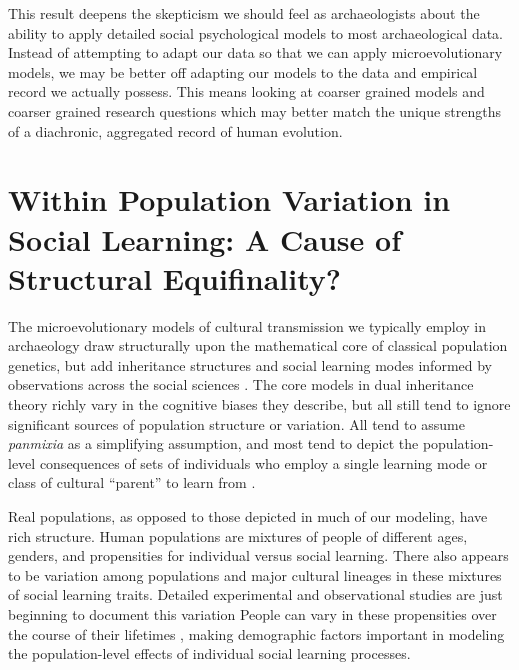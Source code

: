 This result deepens the skepticism we should feel as archaeologists about the ability to apply detailed social psychological models to most archaeological data.   Instead of attempting to adapt our data so that we can apply microevolutionary models, we may be better off adapting our models to the data and empirical record we actually possess.  This means looking at coarser grained models and coarser grained research questions which may better match the unique strengths of a diachronic, aggregated record of human evolution.  

\section{Within Population Variation in Social Learning:  A Cause of Structural Equifinality?}\label{ctmixtures:sec:structural-equifinality}

The microevolutionary models of cultural transmission we typically employ in archaeology draw structurally upon the mathematical core of classical population genetics, but add inheritance structures and social learning modes informed by observations across the social sciences \citep{CF1981,BR1985}.  The core models in dual inheritance theory richly vary in the cognitive biases they describe, but all still tend to ignore significant sources of population structure or variation.  All tend to assume \emph{panmixia} as a simplifying assumption, and most tend to depict the population-level consequences of sets of individuals who employ a single learning mode or class of cultural ``parent'' to learn from \citep{wimsatt2019articulating}.   

Real populations, as opposed to those depicted in much of our modeling, have rich structure.  Human populations are mixtures of people of different ages, genders, and propensities for individual versus social learning.  There also appears to be variation among populations and major cultural lineages in these mixtures of social learning traits.  Detailed experimental and observational studies are just beginning to document this variation \citep{whiten2016cultural,yaveroglu2002cultural,tweed2002learning,chang2011cultural,enquist2007critical,csibra2009natural,tomasello2016ontogeny,lopez2010attention,berl2015cultural,mesoudi2015higher,mesoudi2016evolution}  People can vary in these propensities over the course of their lifetimes \citep{lehmann2013optimal,demps2012social,correa2009children,mesoudi2016evolution}, making demographic factors important in modeling the population-level effects of individual social learning processes.    

